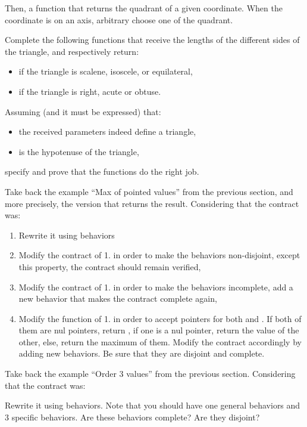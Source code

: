 

Then, a function that returns the quadrant of a given coordinate. When
the coordinate is on an axis, arbitrary choose one of the quadrant.






Complete the following functions that receive the lengths of the different
sides of the triangle, and respectively return:

\begin{itemize}
\item if the triangle is scalene, isoscele, or equilateral,
\item if the triangle is right, acute or obtuse.
\end{itemize}


Assuming (and it must be expressed) that:


\begin{itemize}
\item the received parameters indeed define a triangle,
\item {} is the hypotenuse of the triangle,
\end{itemize}


specify and prove that the functions do the right job.




Take back the example ``Max of pointed values'' from the previous section,
and more precisely, the version that returns the result. Considering that
the contract was:






\begin{enumerate}
\item Rewrite it using behaviors
\item Modify the contract of 1. in order to make the behaviors non-disjoint,
  except this property, the contract should remain verified,
\item Modify the contract of 1. in order to make the behaviors incomplete,
  add a new behavior that makes the contract complete again,
\item Modify the function of 1. in order to accept  pointers
  for both  and . If both of them are nul pointers,
  return , if one is a nul pointer, return the value of
  the other, else, return the maximum of them. Modify the contract accordingly
  by adding new behaviors. Be sure that they are disjoint and complete.
\end{enumerate}




Take back the example ``Order 3 values'' from the previous section. Considering
that the contract was:




Rewrite it using behaviors. Note that you should have one general behaviors
and 3 specific behaviors. Are these behaviors complete? Are they disjoint?
